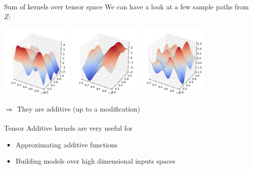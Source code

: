 \documentclass{beamer}
\begin{document}
\begin{frame}{Sum of kernels over tensor space}
We can have a look at a few sample paths from $Z$:
\begin{center}
\includegraphics[width=3.5cm]{figures/python/newfromold-sum2-traj124} \includegraphics[width=3.5cm]{figures/python/newfromold-sum2-traj121} \includegraphics[width=3.5cm]{figures/python/newfromold-sum2-traj123} %
\end{center}
\qquad \alert{$\Rightarrow$ They are additive (up to a modification)}\\ \ \\
Tensor Additive kernels are very useful for
\begin{itemize}
  \item Approximating additive functions
  \item Building models over high dimensional inputs spaces
\end{itemize}
\end{frame}
\end{document}
